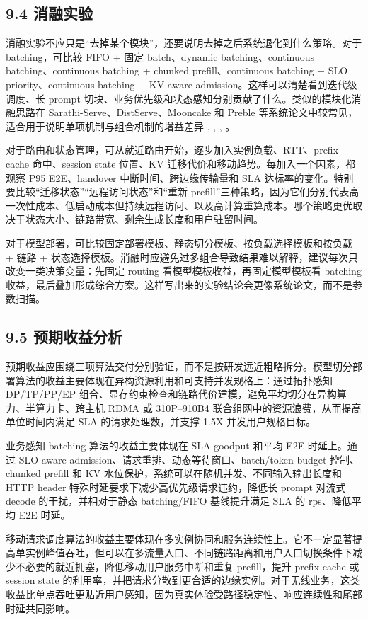 \subsection*{9.4 消融实验}

消融实验不应只是“去掉某个模块”，还要说明去掉之后系统退化到什么策略。对于 batching，可比较 FIFO + 固定 batch、dynamic batching、continuous batching、continuous batching + chunked prefill、continuous batching + SLO priority、continuous batching + KV-aware admission。这样可以清楚看到迭代级调度、长 prompt 切块、业务优先级和状态感知分别贡献了什么。类似的模块化消融思路在 Sarathi-Serve、DistServe、Mooncake 和 Preble 等系统论文中较常见，适合用于说明单项机制与组合机制的增益差异 , , , 。

对于路由和状态管理，可从就近路由开始，逐步加入实例负载、RTT、prefix cache 命中、session state 位置、KV 迁移代价和移动趋势。每加入一个因素，都观察 P95 E2E、handover 中断时间、跨边缘传输量和 SLA 达标率的变化。特别要比较“迁移状态”“远程访问状态”和“重新 prefill”三种策略，因为它们分别代表高一次性成本、低启动成本但持续远程访问、以及高计算重算成本。哪个策略更优取决于状态大小、链路带宽、剩余生成长度和用户驻留时间。

对于模型部署，可比较固定部署模板、静态切分模板、按负载选择模板和按负载 + 链路 + 状态选择模板。消融时应避免过多组合导致结果难以解释，建议每次只改变一类决策变量：先固定 routing 看模型模板收益，再固定模型模板看 batching 收益，最后叠加形成综合方案。这样写出来的实验结论会更像系统论文，而不是参数扫描。


\subsection*{9.5 预期收益分析}

预期收益应围绕三项算法交付分别验证，而不是按研发远近粗略拆分。模型切分部署算法的收益主要体现在异构资源利用和可支持并发规格上：通过拓扑感知 DP/TP/PP/EP 组合、显存约束检查和链路代价建模，避免平均切分在异构算力、半算力卡、跨主机 RDMA 或 310P--910B4 联合组网中的资源浪费，从而提高单位时间内满足 SLA 的请求处理数，并支撑 1.5X 并发用户规格目标。

业务感知 batching 算法的收益主要体现在 SLA goodput 和平均 E2E 时延上。通过 SLO-aware admission、请求重排、动态等待窗口、batch/token budget 控制、chunked prefill 和 KV 水位保护，系统可以在随机并发、不同输入输出长度和 HTTP header 特殊时延要求下减少高优先级请求违约，降低长 prompt 对流式 decode 的干扰，并相对于静态 batching/FIFO 基线提升满足 SLA 的 rps、降低平均 E2E 时延。

移动请求调度算法的收益主要体现在多实例协同和服务连续性上。它不一定显著提高单实例峰值吞吐，但可以在多流量入口、不同链路距离和用户入口切换条件下减少不必要的就近拥塞，降低移动用户服务中断和重复 prefill，提升 prefix cache 或 session state 的利用率，并把请求分散到更合适的边缘实例。对于无线业务，这类收益比单点吞吐更贴近用户感知，因为真实体验受路径稳定性、响应连续性和尾部时延共同影响。


